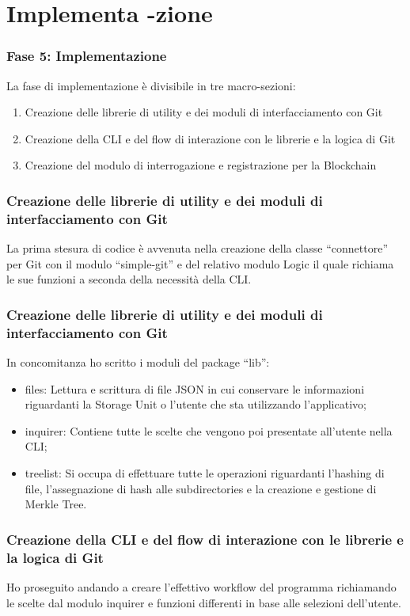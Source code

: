 \documentclass{beamer}
\begin{document}
\section{Implementa -zione}
\begin{frame}
	\frametitle{Fase 5: Implementazione}
	La fase di implementazione è divisibile in tre macro-sezioni:
	\begin{enumerate}
		\item Creazione delle librerie di utility e dei moduli di interfacciamento con Git
  		\item Creazione della CLI e del flow di interazione con le librerie e la logica di Git
  		\item Creazione del modulo di interrogazione e registrazione per la Blockchain
	\end{enumerate}
\end{frame}
\begin{frame}
	\frametitle{Creazione delle librerie di utility e dei moduli di interfacciamento con Git}
	La prima stesura di codice è avvenuta nella creazione della classe “connettore” per Git con il modulo “simple-git” e del relativo modulo Logic il quale richiama le sue funzioni a seconda della necessità della CLI.
\end{frame}
\begin{frame}
	\frametitle{Creazione delle librerie di utility e dei moduli di interfacciamento con Git}
	In concomitanza ho scritto i moduli del package “lib”:
	\begin{itemize}
		\item files: Lettura e scrittura di file JSON in cui conservare le informazioni riguardanti la Storage Unit o l’utente che sta utilizzando l’applicativo;
		\item inquirer: Contiene tutte le scelte che vengono poi presentate all’utente nella CLI;
		\item treelist: Si occupa di effettuare tutte le operazioni riguardanti l’hashing di file, l’assegnazione di hash alle subdirectories e la creazione e gestione di Merkle Tree.
	\end{itemize}
\end{frame}
\begin{frame}
	\frametitle{Creazione della CLI e del flow di interazione con le librerie e la logica di Git}
	Ho proseguito andando a creare l’effettivo workflow del programma richiamando le scelte dal modulo inquirer e funzioni differenti in base alle selezioni dell’utente.	
\end{frame}
\end{document}
